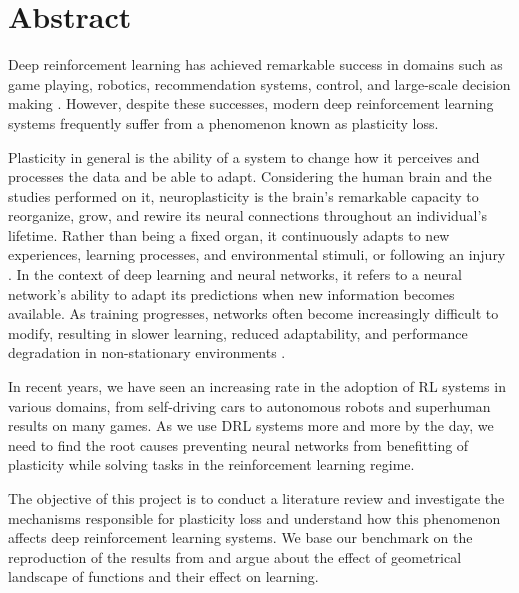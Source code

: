 \section*{Abstract}
Deep reinforcement learning has achieved remarkable success in domains such as game playing, robotics, recommendation systems, control, and large-scale decision making \citep{mnih2015human,silver2017mastering}. However, despite these successes, modern deep reinforcement learning systems frequently suffer from a phenomenon known as plasticity loss.

Plasticity in general is the ability of a system to change how it perceives and processes the data and be able to adapt. Considering the human brain and the studies performed on it, neuroplasticity is the brain's remarkable capacity to reorganize, grow, and rewire its neural connections throughout an individual’s lifetime. Rather than being a fixed organ, it continuously adapts to new experiences, learning processes, and environmental stimuli, or following an injury \citep{puderbaugh2023neuroplasticity}. In the context of deep learning and neural networks, it refers to a neural network’s ability to adapt its predictions when new information becomes available. As training progresses, networks often become increasingly difficult to modify, resulting in slower learning, reduced adaptability, and performance degradation in non-stationary environments \citep{lyle2023understanding,ash2020warm}.

In recent years, we have seen an increasing rate in the adoption of RL systems in various domains, from self-driving cars to autonomous robots and superhuman results on many games. As we use DRL systems more and more by the day, we need to find the root causes preventing neural networks from benefitting of plasticity while solving tasks in the reinforcement learning regime.

The objective of this project is to conduct a literature review and investigate the mechanisms responsible for plasticity loss and understand how this phenomenon affects deep reinforcement learning systems. We base our benchmark on the reproduction of the results from \citep{lyle2023understanding} and argue about the effect of geometrical landscape of functions and their effect on learning.
